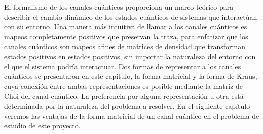 El formalismo de los canales cuánticos proporciona un marco 
teórico para describir el cambio dinámico de los estados cuánticos 
de sistemas que interactúan con su entorno. Una manera 
más intuitiva de llamar a los canales cuánticos es mapeos 
completamente positivos que preservan la traza, para enfatizar 
que los canales cuánticos son mapeos afines de matrices de 
densidad que transforman estados positivos en estados positivos,
sin importar la naturaleza del entorno con el que el sistema podría
interactuar. Dos formas de representar a los canales cuánticos
se presentaron en este capítulo, la forma matricial y 
la forma de Kraus, cuya conexión entre ambas representaciones
es posible mediante la matriz de Choi del canal cuántico. 
La preferencia por alguna representación u otra está determinada 
por la naturaleza del problema a resolver. 
En el siguiente capítulo veremos las ventajas de la forma matricial 
de un canal cuántico en el problema de estudio de este proyecto. 

